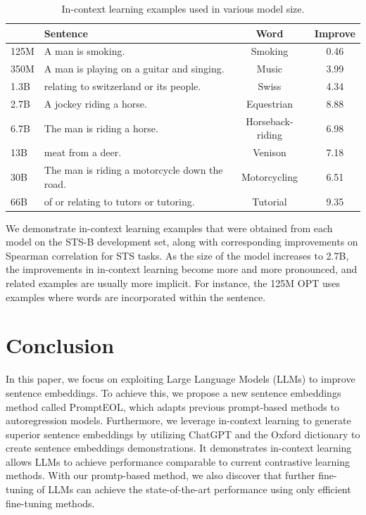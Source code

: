 \documentclass{article}
\begin{document}
\begin{table}
\tiny
\centering
\vspace{-18pt}
\begin{tabular}{lp{2.8cm}cc}
\hline
& Sentence & Word & Improve\\
\hline
125M & A man is smoking. & Smoking & 0.46\\
350M & A man is playing on a guitar and singing. & Music & 3.99\\
1.3B & relating to switzerland or its people. & Swiss & 4.34\\
2.7B & A jockey riding a horse. & Equestrian & 8.88\\
6.7B & The man is riding a horse. & Horseback-riding & 6.98\\
13B & meat from a deer. & Venison & 7.18\\
30B & The man is riding a motorcycle down the road. & Motorcycling & 6.51\\
66B & of or relating to tutors or tutoring. & Tutorial & 9.35\\
\hline
\end{tabular}
\caption{ In-context learning examples used in various model size.
}
\end{table}
We demonstrate in-context learning examples that were obtained from each model on the STS-B development set, along with corresponding improvements on Spearman correlation for STS tasks.
As the size of the model increases to 2.7B, the improvements in in-context learning become more and more pronounced, and related examples are usually more implicit. For instance, the 125M OPT uses examples where words are incorporated within the sentence.

\section{Conclusion}

In this paper, we focus on exploiting Large Language Models (LLMs) to improve sentence embeddings. To achieve this, we propose a new sentence embeddings method called PromptEOL, which adapts previous prompt-based methods to autoregression models.
Furthermore, we leverage in-context learning to generate superior sentence embeddings by utilizing ChatGPT and the Oxford dictionary to create sentence embeddings demonstrations.
It demonstrates in-context learning allows LLMs to achieve performance comparable to current contrastive learning methods.
With our promtp-based method, we also discover that further fine-tuning of LLMs can achieve the state-of-the-art performance using only efficient fine-tuning methods.
\end{document}
